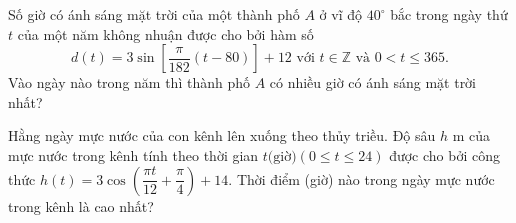 \begin{ex}%
	Số giờ có ánh sáng mặt trời của một thành phố $A$ ở vĩ độ $40^{\circ}$ bắc trong ngày thứ $t$ của một năm  không nhuận được cho bởi hàm số
	 $$
	d(t)=3\sin \left[\frac{\pi}{182}(t-80)\right]+12 \text { với } t \in  \mathbb{Z} \text { và } 0<t \leq 365.
	 $$
	Vào ngày nào trong năm thì thành phố $A$ có nhiều giờ có ánh sáng mặt  trời nhất?
\end{ex}

\begin{ex}%
	Hằng ngày mực nước của con kênh lên xuống theo thủy triều. Độ sâu $h$ m của mực nước trong kênh tính theo thời gian  $t \text{(giờ)}(0 \leq t \leq 24)$ được cho bởi công thức $h(t)=3 \cos \left(\dfrac{\pi t}{12}+\dfrac{\pi}{4}\right)+14$. Thời điểm (giờ) nào trong ngày mực nước trong kênh là cao nhất?
\end{ex}

